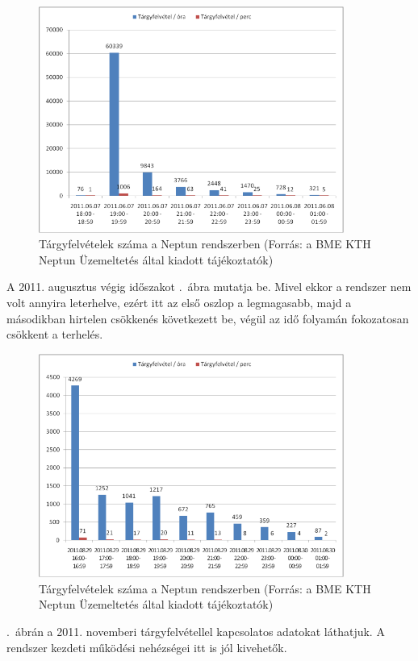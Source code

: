 \begin{figure}[!ht]
\centering
\includegraphics[width=100mm, keepaspectratio]{figures/neptun_003.png}
\caption{Tárgyfelvételek száma a Neptun rendszerben (Forrás: a BME KTH Neptun Üzemeltetés által kiadott tájékoztatók)}
\label{fig:neptun_003}
\end{figure}

A 2011. augusztus végig időszakot .~ábra mutatja be. Mivel ekkor a rendszer nem volt annyira leterhelve, ezért itt az első oszlop a legmagasabb, majd a másodikban hirtelen csökkenés következett be, végül az idő folyamán fokozatosan csökkent a terhelés.

\begin{figure}[!ht]
\centering
\includegraphics[width=100mm, keepaspectratio]{figures/neptun_004.png}
\caption{Tárgyfelvételek száma a Neptun rendszerben (Forrás: a BME KTH Neptun Üzemeltetés által kiadott tájékoztatók)}
\label{fig:neptun_004}
\end{figure}

.~ábrán a 2011. novemberi tárgyfelvétellel kapcsolatos adatokat láthatjuk. A rendszer kezdeti működési nehézségei itt is jól kivehetők.

